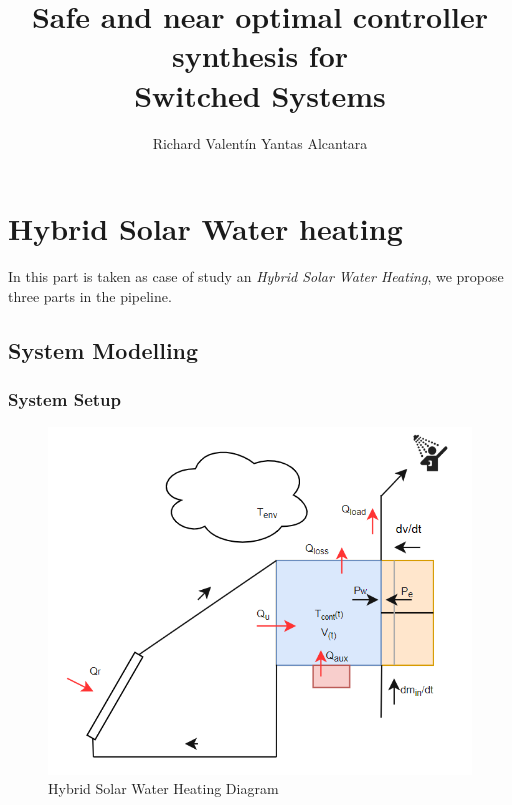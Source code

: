 \documentclass[a4paper,12pt,twoside,openright]{book}
\title{Safe and near optimal controller synthesis for \\Switched Systems}
\author{Richard Valentín Yantas Alcantara}
\begin{document}
\maketitle 




 

\tableofcontents 
\listoftables 
{}
\listoffigures 
{}


\clearpage 
{} 






\chapter{Hybrid Solar Water heating}
\label{ch:proposal}

In this part is taken as case of study an \emph{Hybrid Solar Water Heating}, we propose three parts in the pipeline.

\section{System Modelling}

\subsection{System Setup}

\begin{figure}[h]
  \centering
  \includegraphics[scale=0.6]{images/SWH.png}
  \caption{Hybrid Solar Water Heating Diagram}
  
  \label{fig:systemSetup}
\end{figure}
\end{document}

